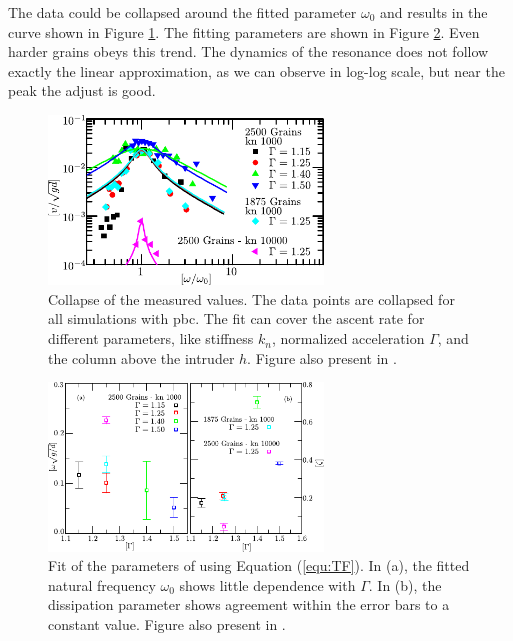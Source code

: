     The data could be collapsed around the fitted parameter $\omega_0$ and results in the curve shown in Figure \ref{fig:BNE_collapse}. The fitting parameters are shown in Figure \ref{fig:BNE_fit_parameters}. Even harder grains obeys this trend. The dynamics of the resonance does not follow exactly the linear approximation, as we can observe in log-log scale, but near the peak the adjust is good.

\begin{figure}
    \centering
    \includegraphics[width=0.65\textwidth]{04-figuras/BNE_Collapse.pdf}
    \caption[BNE with periodic boundary: resonance collapse.]{Collapse of the measured values. The data points are collapsed for all simulations with pbc. The fit can cover the ascent rate for different parameters, like stiffness $k_n$, normalized acceleration $\Gamma$, and the column above the intruder $h$. Figure also present in \cite{Large-deviation_quantification_of_boundary_conditions_on_the_Brazil_nut_effect}.}
    \label{fig:BNE_collapse}
\end{figure}

\begin{figure}
    \centering
    \includegraphics[width=0.65\textwidth]{04-figuras/BNE_Fit.pdf}
    \caption[BNE with periodic boundary: resonance fitting parameters.]{Fit of the parameters of using Equation (\ref{equ:TF}). In (a), the fitted natural frequency $\omega_0$ shows little dependence with $\Gamma$. In (b), the dissipation parameter shows agreement within the error bars to a constant value. Figure also present in \cite{Large-deviation_quantification_of_boundary_conditions_on_the_Brazil_nut_effect}.}
    \label{fig:BNE_fit_parameters}
\end{figure}

